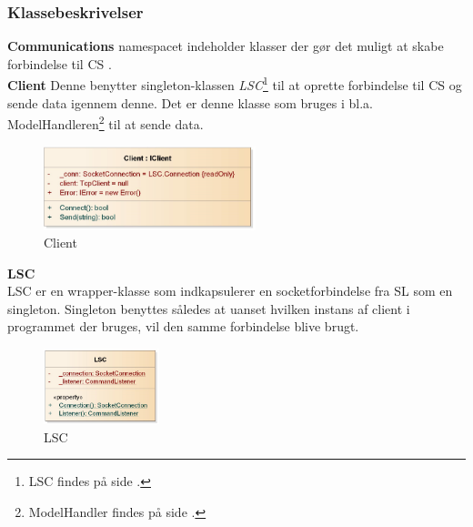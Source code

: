 \subsubsection{Klassebeskrivelser}

\bigskip
\bigskip
\textbf{Communications} namespacet indeholder klasser der gør det muligt at skabe forbindelse til \gls{CS} .\\

\textbf{Client}
Denne benytter singleton-klassen \textit{LSC}\footnote{LSC findes på side \pageref{LSC_Beskrivelse}.} til at oprette forbindelse til \gls{CS} og sende data igennem denne. Det er denne klasse som bruges i bl.a. ModelHandleren{\footnote{ModelHandler findes på side \pageref{Modelhandler_Beskrivelse}.}} til at sende data.
\begin{center}
\begin{figure}[!h]
    \centering
    \includegraphics[width=0.55\textwidth]{Systemdesign/backend/klassebeskrivelser/Images/Client.png}
    \caption{Client}
    \label{fig:modelhandler}
\end{figure}
\end{center}
\label{Modelhandler_Beskrivelse}
 \bigskip 


\textbf{LSC}
\label{LSC_Beskrivelse}\\
LSC er en wrapper-klasse som indkapsulerer en socketforbindelse fra \gls{SL} som en singleton. Singleton benyttes således at uanset hvilken instans af  client i programmet der bruges, vil den samme forbindelse blive brugt. 
\begin{center}
\begin{figure}[!h]
    \centering
    \includegraphics[width=0.30\textwidth]{Systemdesign/backend/klassebeskrivelser/Images/LSC.png}
    \caption{LSC}
    \label{fig:modelhandler}
\end{figure}
\end{center}
\label{Modelhandler_Beskrivelse}
 \bigskip 
